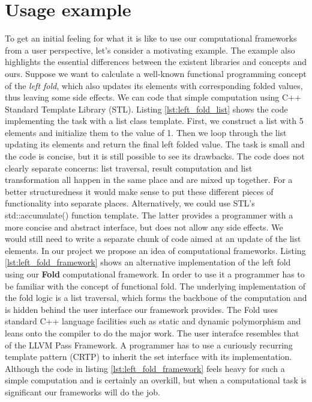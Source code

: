 \section{Usage example}
\label{frameworks_usage_example}
\quad To get an initial feeling for what it is like to use our computational frameworks from a user perspective, let's consider a motivating example. The example also highlights the essential differences between the existent libraries and concepts and ours.\newline\null
\quad Suppose we want to calculate a well-known functional programming concept of the \textit{left fold}, which also updates its elements with corresponding folded values, thus leaving some side effects. We can code that simple computation using C++ Standard Template Library (STL). Listing \ref{lst:left_fold_list} shows the code implementing the task with a list class template. First, we construct a list with 5 elements and initialize them to the value of 1. Then we loop through the list updating its elements and return the final left folded value. The task is small and the code is concise, but it is still possible to see its drawbacks. The code does not clearly separate concerns: list traversal, result computation and list transformation all happen in the same place and are mixed up together. For a better structuredness it would make sense to put these different pieces of functionality into separate places. Alternatively, we could use STL's std::accumulate() function template. The latter provides a programmer with a more concise and abstract interface, but does not allow any side effects. We would still need to write a separate chunk of code aimed at an update of the list elements.\newline\null 
\quad In our project we propose an idea of computational frameworks. Listing \ref{lst:left_fold_framework} shows an alternative implementation of the left fold using our \textbf{Fold} computational framework. In order to use it a programmer has to be familiar with the concept of functional fold. The underlying implementation of the fold logic is a list traversal, which forms the backbone of the computation and is hidden behind the user interface our framework provides. The Fold uses standard C++ language facilities such as static and dynamic polymorphism and leans onto the compiler to do the major work. The user interafce resembles that of the LLVM Pass Framework. A programmer has to use a curiously recurring template pattern (CRTP) to inherit the set interface with its implementation. Although the code in listing \ref{lst:left_fold_framework} feels heavy for such a simple computation and is certainly an overkill, but when a computational task is significant our frameworks will do the job.


